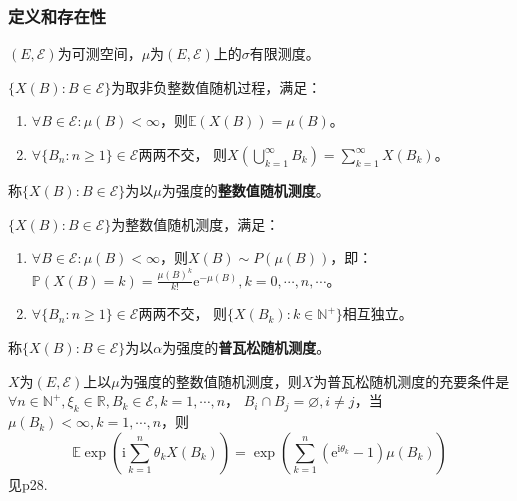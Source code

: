 \documentclass[main]{subfiles}
\begin{document}
\subsubsection{定义和存在性}
\((E,\mathcal{E})\)为可测空间，\(\mu\)为\((E,\mathcal{E})\)上的\(\sigma\)有限测度。
\begin{definition}\label{def:整数值随机测度}
  \(\{X(B):B \in \mathcal{E}\}\)为取非负整数值随机过程，满足：
  \begin{enumerate}
    \item \(\forall B \in \mathcal{E}:\mu(B)<\infty\)，则\(\mathbb{E}(X(B))=\mu(B)\)。
    \item \(\forall \{B_n:n \geq 1\} \in \mathcal{E}\)两两不交，
      则\(X(\bigcup_{k=1}^{\infty} B_k)=\sum_{k=1}^{\infty} X(B_k)\)。
  \end{enumerate}
  称\(\{X(B):B \in \mathcal{E}\}\)为以\(\mu\)为强度的\textbf{整数值随机测度}。
\end{definition}
\begin{definition}\label{def:普瓦松随机测度}
  \(\{X(B):B \in \mathcal{E}\}\)为整数值随机测度，满足：
  \begin{enumerate}
    \item \(\forall B \in \mathcal{E}:\mu(B)<\infty\)，则\(X(B) \sim P(\mu(B))\)，即：
      \(\mathbb{P}(X(B)=k)=\frac{\mu(B)^k}{k!}\mathrm{e}^{-\mu(B)},k=0,\cdots,n,\cdots\)。
    \item \(\forall \{B_n:n \geq 1\} \in \mathcal{E}\)两两不交，
      则\(\{X( B_k):k \in \mathbb{N}^+\}\)相互独立。
  \end{enumerate}
  称\(\{X(B):B \in \mathcal{E}\}\)为以\(\alpha\)为强度的\textbf{普瓦松随机测度}。
\end{definition}
\begin{theorem}\label{the:普瓦松随机测度的充要条件}
  \(X\)为\((E,\mathcal{E})\)上以\(\mu\)为强度的整数值随机测度，则\(X\)为普瓦松随机测度的充要条件是
  \(\forall n \in \mathbb{N}^+,\xi_k \in \mathbb{R}, B_k \in \mathcal{E},k=1,\cdots,n\)， \(B_i \cap B_j =\varnothing,i \neq j \)，当\(\mu(B_k)< \infty,k=1,\cdots,n\)，则\[
    \mathbb{E}\exp(\mathrm{i}\sum_{k=1}^{n} \theta_kX(B_k))=\exp(\sum_{k=1}^{n} (\mathrm{e}^{\mathrm{i}\theta_k}-1)\mu(B_k))
  \]
  见p28.
\end{theorem}
\end{document}
